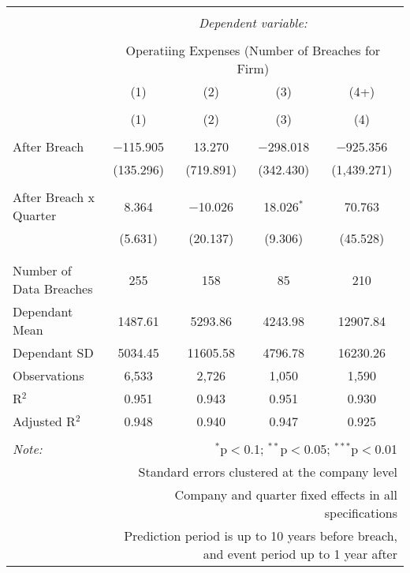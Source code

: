 
\begin{table}[!htbp] \centering 
  \caption{} 
  \label{} 
\begin{tabular}{@{\extracolsep{5pt}}lcccc} 
\\[-1.8ex]\hline 
\hline \\[-1.8ex] 
 & \multicolumn{4}{c}{\textit{Dependent variable:}} \\ 
\cline{2-5} 
\\[-1.8ex] & \multicolumn{4}{c}{Operatiing Expenses (Number of Breaches for Firm)} \\ 
 & (1) & (2) & (3) & (4+) \\ 
\\[-1.8ex] & (1) & (2) & (3) & (4)\\ 
\hline \\[-1.8ex] 
 After Breach & $-$115.905 & 13.270 & $-$298.018 & $-$925.356 \\ 
  & (135.296) & (719.891) & (342.430) & (1,439.271) \\ 
  & & & & \\ 
 After Breach x Quarter & 8.364 & $-$10.026 & 18.026$^{*}$ & 70.763 \\ 
  & (5.631) & (20.137) & (9.306) & (45.528) \\ 
  & & & & \\ 
\hline \\[-1.8ex] 
Number of Data Breaches  & 255 & 158 & 85 & 210 \\ 
Dependant Mean & 1487.61 & 5293.86 & 4243.98 & 12907.84 \\ 
Dependant SD & 5034.45 & 11605.58 & 4796.78 & 16230.26 \\ 
Observations & 6,533 & 2,726 & 1,050 & 1,590 \\ 
R$^{2}$ & 0.951 & 0.943 & 0.951 & 0.930 \\ 
Adjusted R$^{2}$ & 0.948 & 0.940 & 0.947 & 0.925 \\ 
\hline 
\hline \\[-1.8ex] 
\textit{Note:}  & \multicolumn{4}{r}{$^{*}$p$<$0.1; $^{**}$p$<$0.05; $^{***}$p$<$0.01} \\ 
 & \multicolumn{4}{r}{Standard errors clustered at the company level} \\ 
 & \multicolumn{4}{r}{Company and quarter fixed effects in all specifications} \\ 
 & \multicolumn{4}{r}{Prediction period is up to 10 years before breach, and event period up to 1 year after} \\ 
\end{tabular} 
\end{table} 
